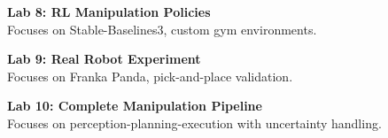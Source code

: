 \vspace{0.2cm}

\noindent\textbf{Lab 8: RL Manipulation Policies} \\
Focuses on Stable-Baselines3, custom gym environments.

\vspace{0.2cm}

\noindent\textbf{Lab 9: Real Robot Experiment} \\
Focuses on Franka Panda, pick-and-place validation.

\vspace{0.2cm}

\noindent\textbf{Lab 10: Complete Manipulation Pipeline} \\
Focuses on perception-planning-execution with uncertainty handling.

\vspace{0.2cm}

\newpage
{}
